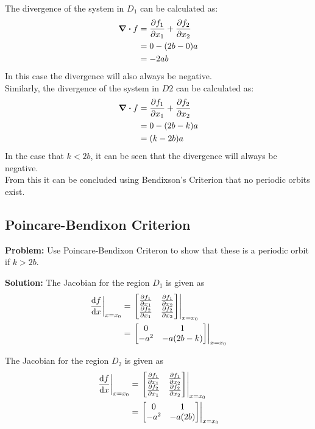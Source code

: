 \documentclass[letter]{article}
\begin{document}
The divergence of the system in $D_1$ can be calculated as:
\begin{align}
	\div f  &= \pdv{f_1}{x_1} + \pdv{f_2}{x_2} \nonumber\\
	&= 0 - (2b - 0)a\\
	&= - 2ab
\end{align}
In this case the divergence will also always be negative.\\


Similarly, the divergence of the system in $D2$ can be calculated as:
\begin{align}
	\div f  &= \pdv{f_1}{x_1} + \pdv{f_2}{x_2} \nonumber\\
	&= 0 - (2b - k)a\\
	&= (k - 2b)a
\end{align}
In the case that $k < 2b$, it can be seen that the divergence will always be negative.\\

From this it can be concluded using Bendixson's Criterion that no periodic orbits exist.

\newpage
\subsection{Poincare-Bendixon Criterion}
\textbf{Problem:}
Use Poincare-Bendixon Criteron to show that these is a periodic orbit if $k > 2b$.

\noindent
\textbf{Solution:}
The Jacobian for the region $D_1$ is given as
\begin{align}
	\eval{\dv{f}{x}}_{x=x_0} 
	&= \eval{\mqty[\pdv{f_1}{x_1} & \pdv{f_1}{x_2}\\
		\pdv{f_2}{x_1} & \pdv{f_2}{x_2}]}_{x=x_0}\\
	&= \eval{\mqty[0 & 1\\ -a^2 & -a(2b - k)]}_{x=x_0}
\end{align}


The Jacobian for the region $D_2$ is given as
\begin{align}
	\eval{\dv{f}{x}}_{x=x_0} 
	&= \eval{\mqty[\pdv{f_1}{x_1} & \pdv{f_1}{x_2}\\
		\pdv{f_2}{x_1} & \pdv{f_2}{x_2}]}_{x=x_0}\\
	&= \eval{\mqty[0 & 1\\ -a^2 & -a(2b)]}_{x=x_0}
\end{align}
\end{document}
